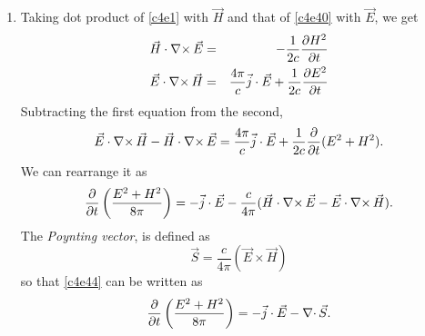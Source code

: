 \begin{enumerate}
\item Taking dot product of \eqref{c4e1} with $\vec{H}$ and that of 
\eqref{c4e40} with $\vec{E}$, we get
\begin{eqnarray*}
\vec{H}\cdot\operatorname{\nabla\times}\vec{E} &=& -\frac{1}{2c}\frac{\partial{H^2}}{\partial{t}} \\
\vec{E}\cdot\operatorname{\nabla\times}\vec{H} &=& \frac{4\pi}{c}\vec{j}\cdot\vec{E} + 
\frac{1}{2c}\frac{\partial{E^2}}{\partial{t}}
\end{eqnarray*}
Subtracting the first equation from the second,
\begin{equation}\label{c4e43}
\vec{E}\cdot\operatorname{\nabla\times}\vec{H} - \vec{H}\cdot\operatorname{\nabla\times}\vec{E} = 
\frac{4\pi}{c}\vec{j}\cdot\vec{E}
+ \frac{1}{2c}\frac{\partial}{\partial t}(E^2 + H^2).
\end{equation}
We can rearrange it as
\begin{equation}\label{c4e44}
\frac{\partial}{\partial t}\left(\frac{E^2 + H^2}{8\pi}\right) = 
-\vec{j}\cdot\vec{E} - 
\frac{c}{4\pi}(\vec{H}\cdot\operatorname{\nabla\times}\vec{E} - \vec{E}\cdot\operatorname{\nabla\times}\vec{H}).
\end{equation}
The \emph{Poynting vector}, is defined as
\begin{equation}\label{c4e45}
\vec{S} = \frac{c}{4\pi}(\vec{E} \times \vec{H})
\end{equation}
so that \eqref{c4e44} can be written as
\begin{equation}\label{c4e46}
\frac{\partial}{\partial t}\left(\frac{E^2 + H^2}{8\pi}\right) = 
-\vec{j}\cdot\vec{E} - \operatorname{\nabla\cdot}\vec{S}.
\end{equation}


\end{enumerate}
